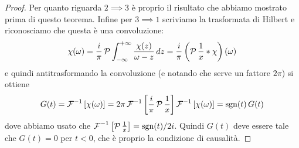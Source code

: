 \begin{proof}
  Per quanto riguarda $ 2 \implies 3 $ è proprio il risultato che abbiamo mostrato prima di questo teorema. 
  Infine per $ 3 \implies 1 $ scriviamo la trasformata di Hilbert e riconosciamo che questa è una convoluzione:
  \begin{align}
    \chi(\omega) = \frac{i}{\pi} \P\int_{-\infty}^{+\infty} \frac{\chi(z)}{\omega - z} \, dz 
    = \frac{i}{\pi} \left( \P\frac1{x} * \chi\right)(\omega)
  \end{align}
  e quindi antitrasformando la convoluzione (e notando che serve un fattore $ 2\pi $) si ottiene 
  \begin{align}
    G(t) = \F^{-1}\left[ \chi(\omega) \right] = 2\pi \F^{-1}\left[ \frac{i}{\pi}\P\frac1x \right] \F^{-1}\left[ \chi(\omega) \right]
    = \sgn(t) \,G(t) 
  \end{align}
  dove abbiamo usato che $ \F^{-1}\left[ \P\frac1x \right] = {\sgn(t)}/{2i} $. Quindi $ G(t) $ deve essere tale che $ G(t) = 0 $ per $ t < 0 $, 
  che è proprio la condizione di causalità.
\end{proof}

